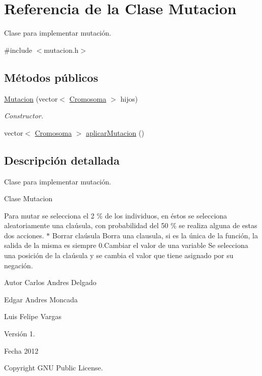 \hypertarget{classMutacion}{\section{Referencia de la Clase Mutacion}
\label{classMutacion}
}


Clase para implementar mutación.  




{\ttfamily \#include $<$mutacion.\-h$>$}

\subsection*{Métodos públicos}
\begin{DoxyCompactItemize}
\item 
\hyperlink{classMutacion_afee3c90f0afc795c89fa0590bef2b667}{Mutacion} (vector$<$ \hyperlink{classCromosoma}{Cromosoma} $>$ hijos)
\begin{DoxyCompactList}\small\item\em Constructor. \end{DoxyCompactList}\item 
vector$<$ \hyperlink{classCromosoma}{Cromosoma} $>$ \hyperlink{classMutacion_a6ef8eb8c3818175895cf7ff56cdfedf0}{aplicar\-Mutacion} ()
\end{DoxyCompactItemize}


\subsection{Descripción detallada}
Clase para implementar mutación. 

\begin{DoxyVerb}Clase Mutacion
\end{DoxyVerb}


Para mutar se selecciona el 2 \% de los individuos, en éstos se selecciona aleatoriamente una claúsula, con probabilidad del 50 \% se realiza alguna de estas dos acciones. $\ast$ Borrar claúsula Borra una clausula, si es la única de la función, la salida de la misma es siempre 0.\-Cambiar el valor de una variable Se selecciona una posición de la claúsula y se cambia el valor que tiene asignado por su negación. \begin{DoxyAuthor}{Autor}
Carlos Andres Delgado 

Edgar Andres Moncada 

Luis Felipe Vargas 
\end{DoxyAuthor}
\begin{DoxyVersion}{Versión}
1. 
\end{DoxyVersion}
\begin{DoxyDate}{Fecha}
2012 
\end{DoxyDate}
\begin{DoxyCopyright}{Copyright}
G\-N\-U Public License. 
\end{DoxyCopyright}


